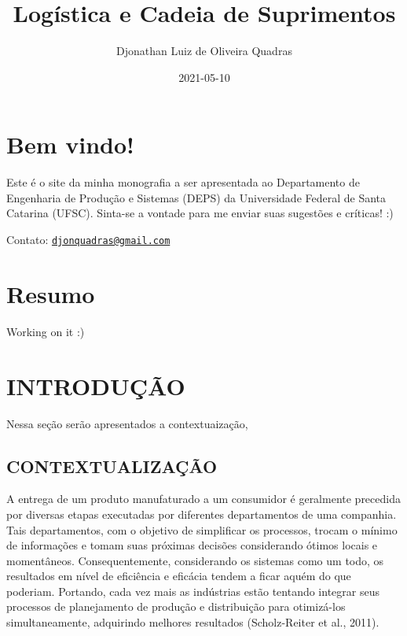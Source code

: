\documentclass[
]{book}
\title{Logística e Cadeia de Suprimentos}
\author{Djonathan Luiz de Oliveira Quadras}
\date{2021-05-10}
\begin{document}
\maketitle

{
\setcounter{tocdepth}{1}
\tableofcontents
}
\hypertarget{bem-vindo}{%
\chapter*{Bem vindo!}\label{bem-vindo}}

Este é o site da minha monografia a ser apresentada ao Departamento de Engenharia de Produção e Sistemas (DEPS) da Universidade Federal de Santa Catarina (UFSC). Sinta-se a vontade para me enviar suas sugestões e críticas! :)

Contato: \href{mailto:djonquadras@gmail.com}{\nolinkurl{djonquadras@gmail.com}}

\hypertarget{resumo}{%
\chapter*{Resumo}\label{resumo}}

Working on it :)

\hypertarget{introduuxe7uxe3o}{%
\chapter{INTRODUÇÃO}\label{introduuxe7uxe3o}}

Nessa seção serão apresentados a contextuaização,

\hypertarget{contextualizauxe7uxe3o}{%
\section{CONTEXTUALIZAÇÃO}\label{contextualizauxe7uxe3o}}

A entrega de um produto manufaturado a um consumidor é geralmente precedida por diversas etapas executadas por diferentes departamentos de uma companhia. Tais departamentos, com o objetivo de simplificar os processos, trocam o mínimo de informações e tomam suas próximas decisões considerando ótimos locais e momentâneos. Consequentemente, considerando os sistemas como um todo, os resultados em nível de eficiência e eficácia tendem a ficar aquém do que poderiam. Portando, cada vez mais as indústrias estão tentando integrar seus processos de planejamento de produção e distribuição para otimizá-los simultaneamente, adquirindo melhores resultados (Scholz-Reiter et al., 2011).
\end{document}
